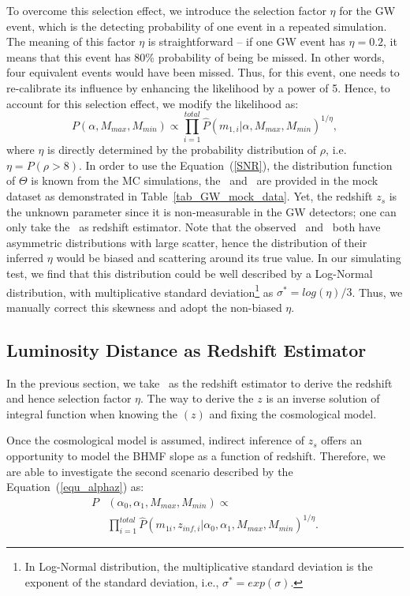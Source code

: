 \documentclass[twocolumn]{aastex62}
\begin{document}
To overcome this selection effect, we introduce the selection factor $\eta$ for the GW event, which is the detecting probability of one event in a repeated simulation. The meaning of this factor $\eta$ is straightforward -- if one GW event has $\eta=0.2$, it means that this event has 80\% probability of being be missed. In other words, four equivalent events would have been missed. Thus, for this event, one needs to re-calibrate its influence by  enhancing the likelihood by a power of 5. Hence, to account for this  selection effect, we modify the likelihood as:
 \begin{equation} \label{equ_lik_sf}
 P(\alpha, M_{max}, M_{min}) \propto  \prod_{i=1}^{total} \hat{P}(m_{1,i}|\alpha, M_{max}, M_{min})^{1/\eta},
 \end{equation}
where $\eta$ is directly determined by the probability distribution of $\rho$, i.e. $\eta = P(\rho>8)$. In order to use the Equation~(\ref{SNR}), the distribution function of $\Theta$ is known from the MC simulations, the \cmass\ and \dl\ are provided in the mock dataset as demonstrated in Table~\ref{tab_GW_mock_data}. Yet, the redshift $z_s$ is the unknown parameter since it is non-measurable in the GW detectors; one can only take the \dl\ as redshift estimator.
Note that the observed \dl\ and \cmass\ both have asymmetric distributions with large scatter, hence the distribution of their inferred $\eta$ would be biased and scattering around its true value. In our simulating test, we find that this distribution could be well described by a Log-Normal distribution, with multiplicative standard deviation\footnote{In Log-Normal distribution, the multiplicative standard deviation is the exponent  of the standard deviation, i.e., $\sigma^* = exp(\sigma)$.} as $\sigma^*=log(\eta)/3$. Thus, we manually correct this skewness and adopt the non-biased $\eta$.

\subsection{Luminosity Distance as Redshift Estimator} 
\label{sec_dl_z}
In the previous section, we take \dl\ as the redshift estimator to derive the redshift and hence selection factor $\eta$. The way to derive the $z$ is an inverse solution of integral function when knowing the \dl$(z)$ and fixing the cosmological model.

Once the cosmological model is assumed, indirect inference of $z_s$ offers an opportunity to model the BHMF slope as a function of redshift. Therefore, we are able to investigate the second scenario described by the Equation~(\ref{equ_alphaz}) as:
 \begin{equation} \label{equ_lik_alphaz}
 \begin{split}
 P&(\alpha_0, \alpha_1, M_{max}, M_{min}) \propto \\
  &\prod_{i=1}^{total} \hat{P}(m_{1i}, z_{inf,i} |\alpha_0, \alpha_1, M_{max}, M_{min})^{1/\eta}.
  \end{split}
 \end{equation}
 
\end{document}
